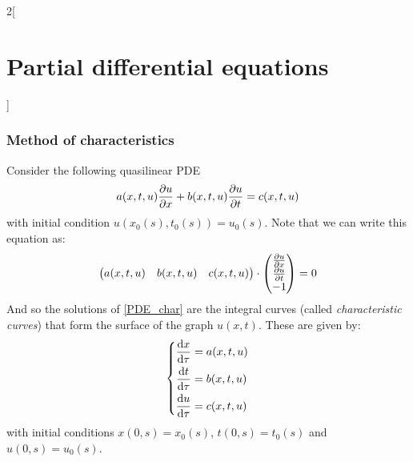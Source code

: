 \documentclass[../../../main_math.tex]{subfiles}
\begin{document}
\begin{multicols}{2}[\section{Partial differential equations}]
  \subsubsection{Method of characteristics}
  \begin{proposition}
    Consider the following quasilinear PDE
    \begin{equation}\label{PDE_char}
      a(x,t,u)\pdv{u}{x}+b(x,t,u)\pdv{u}{t}=c(x,t,u)
    \end{equation}
    with initial condition $u(x_0(s),t_0(s))=u_0(s)$.
    Note that we can write this equation as: $$\begin{pmatrix}
        a(x,t,u) & b(x,t,u) & c(x,t,u)
      \end{pmatrix}\cdot\begin{pmatrix}
        \pdv{u}{x} \\
        \pdv{u}{t} \\
        -1
      \end{pmatrix}=0$$
    And so the solutions of \cref{PDE_char} are the integral curves (called \emph{characteristic curves}) that form the surface of the graph $u(x,t)$. These are given by:
    \begin{equation*}
      \left\{
      \begin{aligned}
        \dv{x}{\tau} & = a(x,t,u) \\
        \dv{t}{\tau} & = b(x,t,u) \\
        \dv{u}{\tau} & = c(x,t,u) \\
      \end{aligned}
      \right.
    \end{equation*}
    with initial conditions $x(0,s)=x_0(s)$, $t(0,s)=t_0(s)$ and $u(0,s)=u_0(s)$.
  \end{proposition}

\end{multicols}
\end{document}
